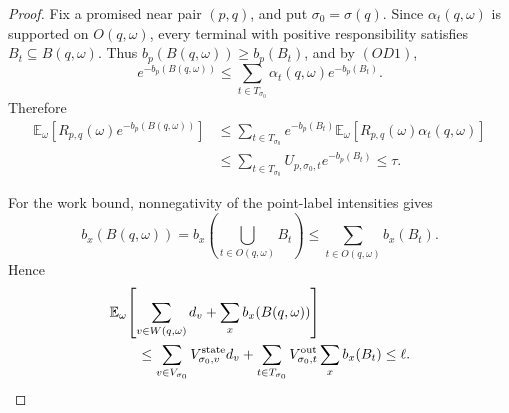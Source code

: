 \documentclass[10pt]{article}
\theoremstyle{definition}
\newcommand{\E}{\mathbb{E}}
\begin{document}
\begin{proof}
   Fix a promised near pair \((p,q)\), and put \(\sigma_0=\sigma(q)\).  Since
   \(\alpha_t(q,\omega)\) is supported on \(O(q,\omega)\), every terminal with
   positive responsibility satisfies \(B_t\subseteq B(q,\omega)\).  Thus
   \(b_p(B(q,\omega))\ge b_p(B_t)\), and by \((OD1)\),
   \[
      e^{-b_p(B(q,\omega))}
      \le
      \sum_{t\in T_{\sigma_0}}
      \alpha_t(q,\omega)e^{-b_p(B_t)} .
   \]
   Therefore
   \[
   \begin{aligned}
      \E_\omega\!\left[
         R_{p,q}(\omega)e^{-b_p(B(q,\omega))}
      \right]
      &\le
      \sum_{t\in T_{\sigma_0}}
      e^{-b_p(B_t)}
      \E_\omega\!\left[
         R_{p,q}(\omega)\alpha_t(q,\omega)
      \right]  \\
      &\le
      \sum_{t\in T_{\sigma_0}}
      U_{p,\sigma_0,t}e^{-b_p(B_t)}
      \le\tau .
   \end{aligned}
   \]

   For the work bound, nonnegativity of the point-label intensities gives
   \[
      b_x(B(q,\omega))
      =
      b_x\!\left(\bigcup_{t\in O(q,\omega)}B_t\right)
      \le
      \sum_{t\in O(q,\omega)}b_x(B_t).
   \]
   Hence
   \[
   \begin{aligned}
      &\E_\omega\!\left[
         \sum_{v\in W(q,\omega)}d_v
         +\sum_xb_x(B(q,\omega))
      \right]  \\
      &\qquad\le
      \sum_{v\in V_{\sigma_0}}
      V^{\rm state}_{\sigma_0,v}d_v
      +
      \sum_{t\in T_{\sigma_0}}
      V^{\rm out}_{\sigma_0,t}\sum_xb_x(B_t)
      \le\ell .
   \end{aligned}
   \]
\end{proof}
\end{document}
